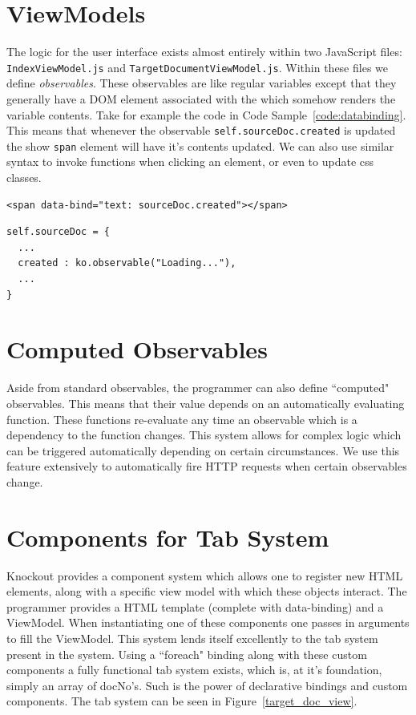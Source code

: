 \documentclass{l4proj}
\newcommand{\code}[1]{\texttt{#1}}
\newenvironment{codelisting}{\captionsetup{type=listing}}{}
\begin{document}
\section{ViewModels}
The logic for the user interface exists almost entirely within two JavaScript files: \code{IndexViewModel.js} and \code{TargetDocumentViewModel.js}. Within these files we define \textit{observables}. These observables are like regular variables except that they generally have a DOM element associated with the which somehow renders the variable contents.
Take for example the code in Code Sample~\ref{code:databinding}. This means that whenever the observable \code{self.sourceDoc.created} is updated the show \code{span} element will have it's contents updated. We can also use similar syntax to invoke functions when clicking an element, or even to update css classes.
\begin{codelisting}
\begin{verbatim}
<span data-bind="text: sourceDoc.created"></span>
\end{verbatim}
\begin{verbatim}
self.sourceDoc = {
  ...
  created : ko.observable("Loading..."),
  ...
}
\end{verbatim}
\label{code:databinding}
\end{codelisting}

\section{Computed Observables}
Aside from standard observables, the programmer can also define ``computed" observables. This means that their value depends on an automatically evaluating function. These functions re-evaluate any time an observable which is a dependency to the function changes. This system allows for complex logic which can be triggered automatically depending on certain circumstances.
We use this feature extensively to automatically fire HTTP requests when certain observables change.

\section{Components for Tab System}
Knockout provides a component system which allows one to register new HTML elements, along with a specific view model with which these objects interact. The programmer provides a HTML template (complete with data-binding) and a ViewModel. When instantiating one of these components one passes in arguments to fill the ViewModel.
This system lends itself excellently to the tab system present in the system. Using a ``foreach" binding along with these custom components a fully functional tab system exists, which is, at it's foundation, simply an array of docNo's. Such is the power of declarative bindings and custom components. The tab system can be seen in Figure~\ref{target_doc_view}.
\end{document}
